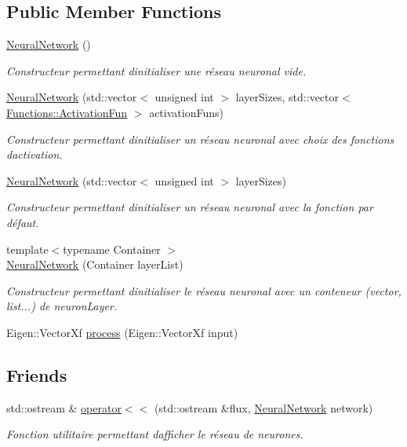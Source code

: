 \subsection*{Public Member Functions}
\begin{DoxyCompactItemize}
\item 
\hyperlink{classNeuralNetwork_accce4a7728e89a009a9d4ca1758c9b9d}{Neural\+Network} ()
\begin{DoxyCompactList}\small\item\em Constructeur permettant d\textquotesingle{}initialiser une réseau neuronal vide. \end{DoxyCompactList}\item 
\hyperlink{classNeuralNetwork_a85cd20f411e96dfd28954fcda39badb7}{Neural\+Network} (std\+::vector$<$ unsigned int $>$ layer\+Sizes, std\+::vector$<$ \hyperlink{structFunctions_ad25362ffa52b2f7933431190546593ac}{Functions\+::\+Activation\+Fun} $>$ activation\+Funs)
\begin{DoxyCompactList}\small\item\em Constructeur permettant d\textquotesingle{}initialiser un réseau neuronal avec choix des fonctions d\textquotesingle{}activation. \end{DoxyCompactList}\item 
\hyperlink{classNeuralNetwork_ab4015471a72a3d00b6bcabf156526f7b}{Neural\+Network} (std\+::vector$<$ unsigned int $>$ layer\+Sizes)
\begin{DoxyCompactList}\small\item\em Constructeur permettant d\textquotesingle{}initialiser un réseau neuronal avec la fonction par défaut. \end{DoxyCompactList}\item 
{\footnotesize template$<$typename Container $>$ }\\\hyperlink{classNeuralNetwork_a7943bb4e9cb96aae048b236d4f1dd979}{Neural\+Network} (Container layer\+List)
\begin{DoxyCompactList}\small\item\em Constructeur permettant d\textquotesingle{}initialiser le réseau neuronal avec un conteneur (vector, list...) de neuron\+Layer. \end{DoxyCompactList}\item 
Eigen\+::\+Vector\+Xf \hyperlink{classNeuralNetwork_a98cab3b3726fbf06dca316068c29c783}{process} (Eigen\+::\+Vector\+Xf input)
\end{DoxyCompactItemize}
\subsection*{Friends}
\begin{DoxyCompactItemize}
\item 
std\+::ostream \& \hyperlink{classNeuralNetwork_a0ecebf9a494437efb917804ed271e13f}{operator$<$$<$} (std\+::ostream \&flux, \hyperlink{classNeuralNetwork}{Neural\+Network} network)
\begin{DoxyCompactList}\small\item\em Fonction utilitaire permettant d\textquotesingle{}afficher le réseau de neurones. \end{DoxyCompactList}\end{DoxyCompactItemize}


